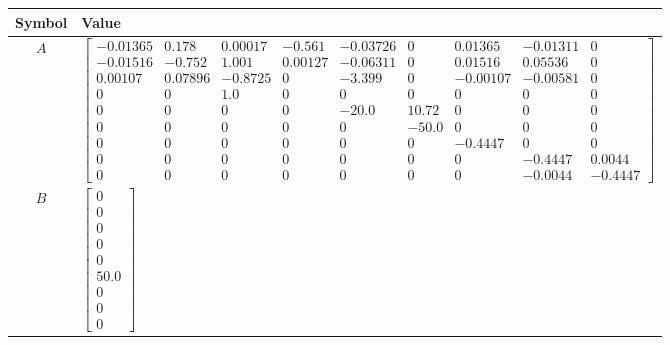 \begin{tabular}{cl}
\hline
  Symbol  & Value                                                                                                                                                                                                                                                                                                                                                                                                                                                                                                                                 \\
\hline
   $A$    & $\left[\begin{matrix}-0.01365 & 0.178 & 0.00017 & -0.561 & -0.03726 & 0 & 0.01365 & -0.01311 & 0\\-0.01516 & -0.752 & 1.001 & 0.00127 & -0.06311 & 0 & 0.01516 & 0.05536 & 0\\0.00107 & 0.07896 & -0.8725 & 0 & -3.399 & 0 & -0.00107 & -0.00581 & 0\\0 & 0 & 1.0 & 0 & 0 & 0 & 0 & 0 & 0\\0 & 0 & 0 & 0 & -20.0 & 10.72 & 0 & 0 & 0\\0 & 0 & 0 & 0 & 0 & -50.0 & 0 & 0 & 0\\0 & 0 & 0 & 0 & 0 & 0 & -0.4447 & 0 & 0\\0 & 0 & 0 & 0 & 0 & 0 & 0 & -0.4447 & 0.0044\\0 & 0 & 0 & 0 & 0 & 0 & 0 & -0.0044 & -0.4447\end{matrix}\right]$ \\
   $B$    & $\left[\begin{matrix}0\\0\\0\\0\\0\\50.0\\0\\0\\0\end{matrix}\right]$                                                                                                                                                                                                                                                                                                                                                                                                                                                                 \\

\end{tabular}

